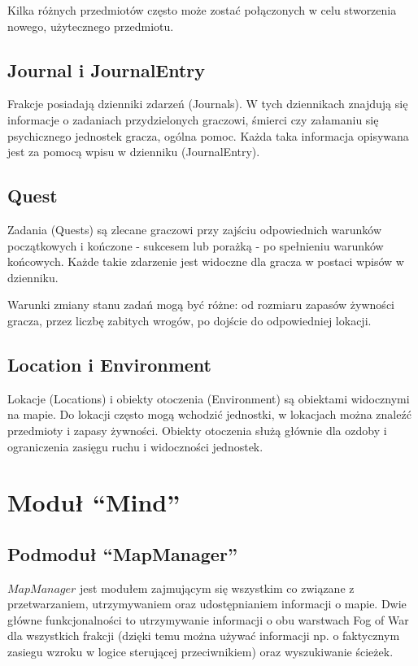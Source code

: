 \documentclass[licencjacka]{pracamgr}
\begin{document}
      Kilka różnych przedmiotów często może zostać połączonych w celu stworzenia nowego, użytecznego przedmiotu.

    \subsection{Journal i JournalEntry}
      Frakcje posiadają dzienniki zdarzeń (Journals). W tych dziennikach znajdują się informacje o zadaniach
      przydzielonych graczowi, śmierci czy załamaniu się psychicznego jednostek gracza, ogólna pomoc. Każda taka
      informacja opisywana jest za pomocą wpisu w dzienniku (JournalEntry).

    \subsection{Quest}
      Zadania (Quests) są zlecane graczowi przy zajściu odpowiednich warunków początkowych i kończone - sukcesem lub
      porażką - po spełnieniu warunków końcowych. Każde takie zdarzenie jest widoczne dla gracza w postaci wpisów w
      dzienniku.

      Warunki zmiany stanu zadań mogą być różne: od rozmiaru zapasów żywności gracza, przez liczbę zabitych wrogów, po
      dojście do odpowiedniej lokacji.

    \subsection{Location i Environment}
      Lokacje (Locations) i obiekty otoczenia (Environment) są obiektami widocznymi na mapie. Do lokacji często mogą
      wchodzić jednostki, w lokacjach można znaleźć przedmioty i zapasy żywności. Obiekty otoczenia służą głównie dla
      ozdoby i ograniczenia zasięgu ruchu i widoczności jednostek.

  \section{Moduł ``Mind''}
    \subsection{Podmoduł ``MapManager''}
    $MapManager$ jest modułem zajmującym się wszystkim co związane z przetwarzaniem, utrzymywaniem oraz udostępnianiem
    informacji o mapie. Dwie główne funkcjonalności to utrzymywanie informacji o obu warstwach Fog of War dla wszystkich
    frakcji (dzięki temu można używać informacji np. o faktycznym zasiegu wzroku w logice sterującej przeciwnikiem) oraz
    wyszukiwanie ścieżek.
\end{document}

